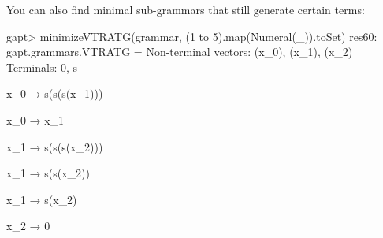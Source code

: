 \documentclass[a4paper,11pt]{book}
\begin{document}
You can also find minimal sub-grammars that still generate certain terms:
\begin{clilisting}
gapt> minimizeVTRATG(grammar, (1 to 5).map(Numeral(_)).toSet)
res60: gapt.grammars.VTRATG =
Non-terminal vectors: (x_0), (x_1), (x_2)
Terminals: 0, s

x_0 → s(s(s(x_1)))

x_0 → x_1

x_1 → s(s(s(x_2)))

x_1 → s(s(x_2))

x_1 → s(x_2)

x_2 → 0

\end{clilisting}





\vfill
\pagebreak
\end{document}
